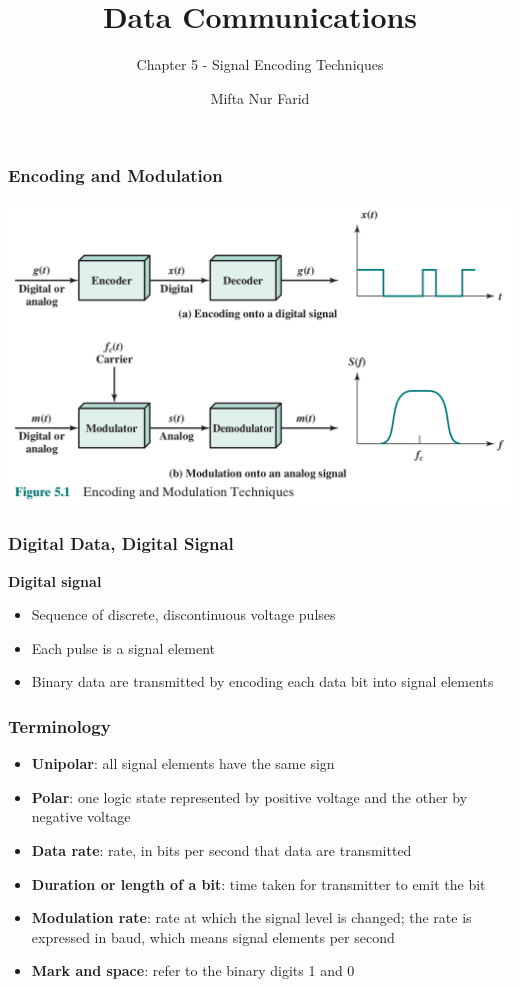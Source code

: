 \documentclass[pdflatex,compress]{beamer}
\title{Data Communications}
\subtitle{Chapter 5 - Signal Encoding Techniques}
\author{Mifta Nur Farid}
\begin{document}
\maketitle

\begin{frame}
	\frametitle{Encoding and Modulation}
	\begin{center}
		\includegraphics[width=\linewidth]{img/img01}
	\end{center}
\end{frame}

\begin{frame}
	\frametitle{Digital Data, Digital Signal}
	\textbf{Digital signal}
	\begin{itemize}
		\item Sequence of discrete, discontinuous voltage pulses
		\item Each pulse is a signal element
		\item Binary data are transmitted by encoding each data bit into signal elements
	\end{itemize}
\end{frame}

\begin{frame}
	\frametitle{Terminology}
	\begin{itemize}
		\item \textbf{Unipolar}: all signal elements have the same sign
		\item \textbf{Polar}: one logic state represented by positive voltage and the other by negative voltage
		\item \textbf{Data rate}: rate, in bits per second that data are transmitted
		\item \textbf{Duration or length of a bit}: time taken for transmitter to emit the bit
		\item \textbf{Modulation rate}: rate at which the signal level is changed; the rate is expressed in baud, which means signal elements per second
		\item \textbf{Mark and space}: refer to the binary digits 1 and 0
	\end{itemize}
\end{frame}
\end{document}
